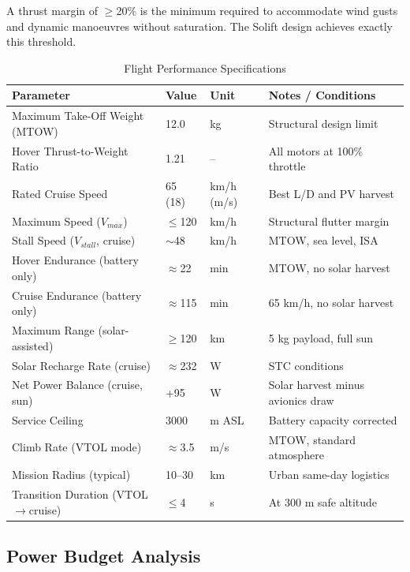 A thrust margin of $\geq$20\% is the minimum required to accommodate wind gusts and dynamic manoeuvres without saturation. The Solift design achieves exactly this threshold.

\begin{table}[H]
\centering
\small
\caption{Flight Performance Specifications}
\begin{tabularx}{\textwidth}{L{5cm} C{3cm} C{1.8cm} X}
\toprule
\textbf{Parameter} &
\textbf{Value} &
\textbf{Unit} &
\textbf{Notes / Conditions} \\
\midrule
Maximum Take-Off Weight (MTOW)    & 12.0          & kg         & Structural design limit \\
Hover Thrust-to-Weight Ratio      & 1.21          & --         & All motors at 100\% throttle \\
Rated Cruise Speed                & 65 (18)       & km/h (m/s) & Best L/D and PV harvest \\
Maximum Speed ($V_{max}$)         & $\leq$120     & km/h       & Structural flutter margin \\
Stall Speed ($V_{stall}$, cruise) & $\sim$48      & km/h       & MTOW, sea level, ISA \\
Hover Endurance (battery only)    & $\approx$22   & min        & MTOW, no solar harvest \\
Cruise Endurance (battery only)   & $\approx$115  & min        & 65 km/h, no solar harvest \\
Maximum Range (solar-assisted)    & $\geq$120     & km         & 5 kg payload, full sun \\
Solar Recharge Rate (cruise)      & $\approx$232  & W          & STC conditions \\
Net Power Balance (cruise, sun)   & +95           & W          & Solar harvest minus avionics draw \\
Service Ceiling                   & 3000          & m ASL      & Battery capacity corrected \\
Climb Rate (VTOL mode)            & $\approx$3.5  & m/s        & MTOW, standard atmosphere \\
Mission Radius (typical)          & 10--30        & km         & Urban same-day logistics \\
Transition Duration (VTOL$\to$cruise) & $\leq$4  & s          & At 300 m safe altitude \\
\bottomrule
\end{tabularx}
\end{table}

\subsection{Power Budget Analysis}

